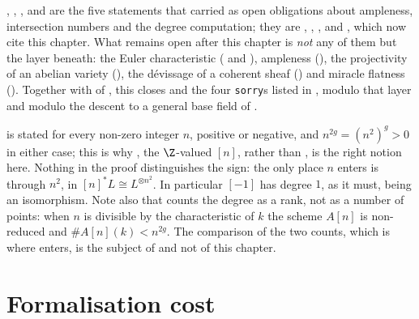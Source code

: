 \begin{remark}\label{rem:deg-discharged}
, ,
,  and
 are the five statements that
 carried as open obligations about ampleness, intersection
numbers and the degree computation; they are
, ,
,  and
, which now cite this chapter.  What remains open
after this chapter is \emph{not} any of them but the layer beneath: the Euler
characteristic ( and
), ampleness
(), the projectivity of an abelian variety
(), the d\'evissage of a coherent sheaf
() and miracle flatness
().  Together with
 of , this closes
 and the four \texttt{sorry}s listed in
, modulo that layer and modulo the descent to a general
base field of .
\end{remark}

\begin{remark}
\label{rem:deg-negative-n}
 is stated for every non-zero integer $n$, positive
or negative, and $n^{2g}=(n^2)^g>0$ in either case; this is why
, the $\Z$-valued $[n]$, rather than
, is the right notion here.  Nothing in the proof
distinguishes the sign: the only place $n$ enters is through $n^2$, in
$[n]^*L\cong L^{\otimes n^2}$.  In particular $[-1]$ has degree $1$, as it must,
being an isomorphism.  Note also that  counts the
degree as a rank, not as a number of points: when $n$ is divisible by the
characteristic of $k$ the scheme $A[n]$ is non-reduced and
$\#A[n](k)<n^{2g}$.  The comparison of the two counts, which is where
 enters, is the subject of
 and not of this chapter.
\end{remark}

\section{Formalisation cost}\label{sec:deg-cost}

